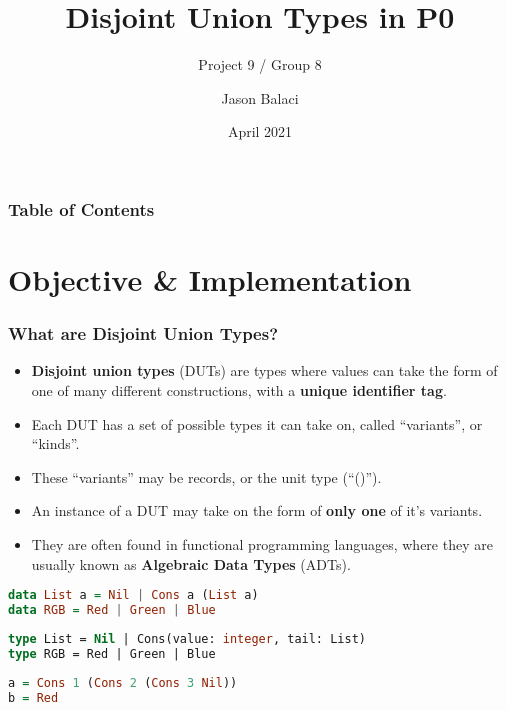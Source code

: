 \documentclass{beamer}
\title[Disjoint Union Types]{Disjoint Union Types in P0}
\subtitle{Project 9 / Group 8}
\author{Jason Balaci}
\institute{McMaster University}
\date{April 2021}
\begin{document}
\frame{\titlepage}

\begin{frame}
\frametitle{Table of Contents}
\tableofcontents
\end{frame}

\section{Objective \& Implementation}

\begin{frame}
\frametitle{What are Disjoint Union Types?}

\begin{itemize}
 \item<1-> \textbf{Disjoint union types} (DUTs) are types where values can take the form of one of many different constructions, with a \textbf{unique identifier tag}.
 \item<2-> Each DUT has a set of possible types it can take on, called ``variants'', or ``kinds''.
 \item<3-> These ``variants'' may be records, or the unit type (``()'').
 \item<4-> An instance of a DUT may take on the form of \textbf{only one} of it's variants. 
 \item<5-> They are often found in functional programming languages, where they are usually known as \textbf{Algebraic Data Types} (ADTs).
\end{itemize}

\end{frame}

\begin{lrbox}{\haskellTypes}
\begin{lstlisting}[language=Haskell, basicstyle=\footnotesize]
data List a = Nil | Cons a (List a)
data RGB = Red | Green | Blue
\end{lstlisting}
\end{lrbox}

\begin{lrbox}{\pZeroTypes}
\begin{lstlisting}[language=Pascal, basicstyle=\footnotesize]
type List = Nil | Cons(value: integer, tail: List)
type RGB = Red | Green | Blue
\end{lstlisting}
\end{lrbox}


\begin{lrbox}{\haskellTypesInst}
\begin{lstlisting}[language=Haskell, basicstyle=\footnotesize]
a = Cons 1 (Cons 2 (Cons 3 Nil))
b = Red
\end{lstlisting}
\end{lrbox}
\end{document}
